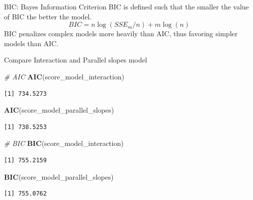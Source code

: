 \documentclass[
  ignorenonframetext,
]{beamer}
\newenvironment{Shaded}{\begin{snugshade}}{\end{snugshade}}
\newcommand{\CommentTok}[1]{\textcolor[rgb]{0.56,0.35,0.01}{\textit{#1}}}
\newcommand{\FunctionTok}[1]{\textcolor[rgb]{0.13,0.29,0.53}{\textbf{#1}}}
\newcommand{\NormalTok}[1]{#1}
\begin{document}
\begin{frame}{BIC: Bayes Information Criterion}
\label{bic-bayes-information-criterion}
BIC is defined such that the smaller the value of BIC the better the
model. \[BIC=n\log (SSE_m/n)+m\log(n)\] BIC penalizes complex models
more heavily than AIC, thus favoring simpler models than AIC.
\end{frame}

\begin{frame}[fragile]{Compare Interaction and Parallel slopes model}
\label{compare-interaction-and-parallel-slopes-model-3}
\normalsize

\begin{Shaded}
\begin{Highlighting}[]
\CommentTok{\# AIC}
\FunctionTok{AIC}\NormalTok{(score\_model\_interaction)}
\end{Highlighting}
\end{Shaded}

\begin{verbatim}
[1] 734.5273
\end{verbatim}

\begin{Shaded}
\begin{Highlighting}[]
\FunctionTok{AIC}\NormalTok{(score\_model\_parallel\_slopes)}
\end{Highlighting}
\end{Shaded}

\begin{verbatim}
[1] 738.5253
\end{verbatim}

\begin{Shaded}
\begin{Highlighting}[]
\CommentTok{\# BIC}
\FunctionTok{BIC}\NormalTok{(score\_model\_interaction)}
\end{Highlighting}
\end{Shaded}

\begin{verbatim}
[1] 755.2159
\end{verbatim}

\begin{Shaded}
\begin{Highlighting}[]
\FunctionTok{BIC}\NormalTok{(score\_model\_parallel\_slopes)}
\end{Highlighting}
\end{Shaded}

\begin{verbatim}
[1] 755.0762
\end{verbatim}

\normalsize
\end{frame}
\end{document}
